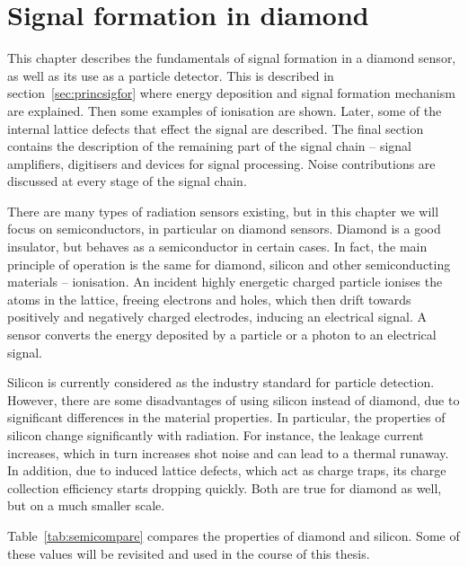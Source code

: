 
\chapter{Signal formation in diamond}
\label{ch:diamond}

This chapter describes the fundamentals of signal formation in a diamond sensor, as well as its use as a particle detector. This is described in section~\ref{sec:princsigfor} where energy deposition and signal formation mechanism are explained. Then some examples of ionisation are shown. Later, some of the internal lattice defects that effect the signal are described. The final section contains the description of the remaining part of the signal chain -- signal amplifiers, digitisers and devices for signal processing. Noise contributions are discussed at every stage of the signal chain.

There are many types of radiation sensors existing, but in this chapter we will focus on semiconductors, in particular on diamond sensors. Diamond is a good insulator, but behaves as a semiconductor in certain cases.  In fact, the main principle of operation is the same for diamond, silicon and other semiconducting materials -- ionisation.  An incident highly energetic charged particle ionises the atoms in the lattice, freeing electrons and holes, which then drift towards positively and negatively charged electrodes, inducing an electrical signal. A sensor converts the energy deposited by a particle or a photon to an electrical signal.

Silicon is currently considered as the industry standard for particle detection. However, there are some disadvantages of using silicon instead of diamond, due to significant differences in the material properties. In particular, the properties of silicon change significantly with radiation. For instance, the leakage current increases, which in turn increases shot noise and can lead to a thermal runaway. In addition, due to induced lattice defects, which act as charge traps, its charge collection efficiency starts dropping quickly. Both are true for diamond as well, but on a much smaller scale.

Table~\ref{tab:semicompare} compares the properties of diamond and silicon. Some of these values will be revisited and used in the course of this thesis.


